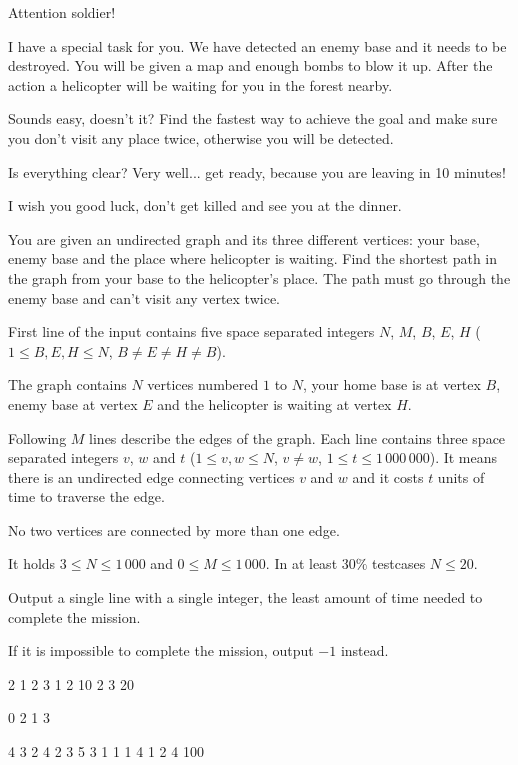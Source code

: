 





\noindent
Attention soldier!

\bigskip \noindent
I have a special task for you. We have detected an enemy base and it needs to be destroyed. You will be given a map and enough bombs to blow it up. After the action a helicopter will be waiting for you in the forest nearby.

\bigskip \noindent
Sounds easy, doesn't it? Find the fastest way to achieve the goal and make sure you don't visit any place twice, otherwise you will be detected.

\bigskip \noindent
Is everything clear? Very well... get ready, because you are leaving in 10 minutes!

\bigskip \noindent
I wish you good luck, don't get killed and see you at the dinner.


You are given an undirected graph and its three different vertices: your base, enemy base and the place where helicopter is waiting. Find the shortest path in the graph from your base to the helicopter's place. The path must go through the enemy base and can't visit any vertex twice.


First line of the input contains five space separated integers $N$, $M$, $B$, $E$, $H$
($1 \le B, E, H \le N$, $B \neq E \neq H \neq B$).

The graph contains $N$ vertices numbered $1$ to $N$, your home base is at vertex $B$, enemy base at vertex $E$ and the helicopter is waiting at vertex $H$.

Following $M$ lines describe the edges of the graph.
Each line contains three space separated integers $v$, $w$ and $t$ ($1 \le v, w \le N$, $v \neq w$, $1 \le t \le 1\,000\,000$).
It means there is an undirected edge connecting vertices $v$ and $w$ and it costs $t$ units of time to traverse the edge.

No two vertices are connected by more than one edge.

\smallskip
It holds $3 \le N \le 1\,000$ and $0 \le M \le 1\,000$.
In at least $30\%$ testcases $N\le 20$.


Output a single line with a single integer, the least amount of time needed to complete the mission.

If it is impossible to complete the mission, output $-1$ instead.



 2 1 2 3
1 2 10
2 3 20
\sampleEND


\bigskip


 0 2 1 3
\sampleEND


\bigskip


 4 3 2 4
2 3 5
3 1 1
1 4 1
2 4 100
\sampleEND


